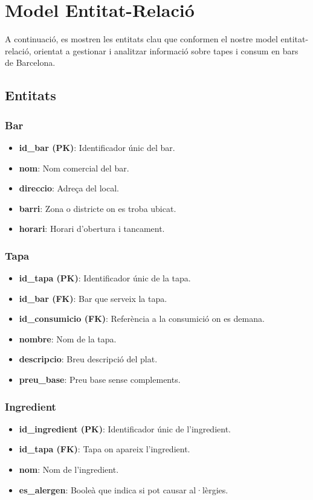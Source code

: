 \documentclass[12pt,a4paper]{article}
\begin{document}
\section{Model Entitat-Relació}

A continuació, es mostren les entitats clau que conformen el nostre model entitat-relació, orientat a gestionar i analitzar informació sobre tapes i consum en bars de Barcelona.
\subsection{Entitats}
\subsubsection*{Bar}
\begin{itemize}
    \item \textbf{id\_bar (PK)}: Identificador únic del bar.
    \item \textbf{nom}: Nom comercial del bar.
    \item \textbf{direccio}: Adreça del local.
    \item \textbf{barri}: Zona o districte on es troba ubicat.
    \item \textbf{horari}: Horari d'obertura i tancament.
\end{itemize}

\subsubsection*{Tapa}
\begin{itemize}
    \item \textbf{id\_tapa (PK)}: Identificador únic de la tapa.
    \item \textbf{id\_bar (FK)}: Bar que serveix la tapa.
    \item \textbf{id\_consumicio (FK)}: Referència a la consumició on es demana.
    \item \textbf{nombre}: Nom de la tapa.
    \item \textbf{descripcio}: Breu descripció del plat.
    \item \textbf{preu\_base}: Preu base sense complements.
\end{itemize}

\subsubsection*{Ingredient}
\begin{itemize}
    \item \textbf{id\_ingredient (PK)}: Identificador únic de l'ingredient.
    \item \textbf{id\_tapa (FK)}: Tapa on apareix l’ingredient.
    \item \textbf{nom}: Nom de l’ingredient.
    \item \textbf{es\_alergen}: Booleà que indica si pot causar al·lèrgies.
\end{itemize}
\end{document}
